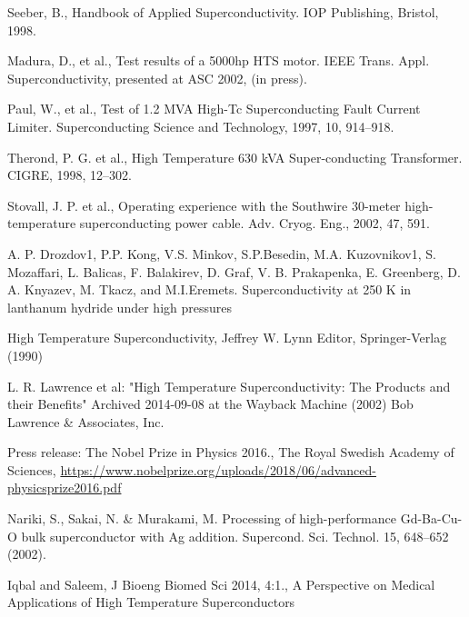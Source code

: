 \documentclass{article}
\begin{document}
	
	\begin{thebibliography}{1}
		
		
		\newblock Seeber, B., Handbook of Applied Superconductivity. IOP Publishing, Bristol, 1998.
		
		\newblock Madura, D., et al., Test results of a 5000hp HTS motor. IEEE Trans. Appl. Superconductivity, presented at ASC 2002, (in press).
		
		\newblock Paul, W., et al., Test of 1.2 MVA High-Tc Superconducting Fault Current Limiter. Superconducting Science and Technology, 1997, 10, 914–918.
		
		\newblock Therond, P. G. et al., High Temperature 630 kVA Super-conducting Transformer. CIGRE, 1998, 12–302.
		
		\newblock Stovall, J. P. et al., Operating experience with the Southwire 30-meter high-temperature superconducting power cable. Adv. Cryog. Eng., 2002, 47, 591.
		
		A. P. Drozdov1, P.P. Kong, V.S. Minkov, S.P.Besedin, M.A. Kuzovnikov1, S. Mozaffari, L. Balicas, F. Balakirev, D. Graf, V. B. Prakapenka, E. Greenberg, D. A. Knyazev, M. Tkacz, and M.I.Eremets.
		\newblock Superconductivity at 250 K in lanthanum hydride under high pressures
		
		
		\newblock High Temperature Superconductivity, Jeffrey W. Lynn Editor, Springer-Verlag (1990)
		
		\newblock L. R. Lawrence et al: "High Temperature Superconductivity: The Products and their Benefits" Archived 2014-09-08 at the Wayback Machine (2002) Bob Lawrence \& Associates, Inc.
		
		\newblock Press release: The Nobel Prize in Physics 2016., The Royal Swedish Academy of Sciences, \href{https://www.nobelprize.org/uploads/2018/06/advanced-physicsprize2016.pdf}{https://www.nobelprize.org/uploads/2018/06/advanced-physicsprize2016.pdf}
		
		
		\newblock Nariki, S., Sakai, N. \& Murakami, M. Processing of high-performance Gd-Ba-Cu-O bulk
		superconductor with Ag addition. Supercond. Sci. Technol. 15, 648–652 (2002).
		
		\newblock Iqbal and Saleem, J Bioeng Biomed Sci 2014, 4:1., A Perspective on Medical Applications of High Temperature Superconductors
		

\end{thebibliography}
\end{document}
